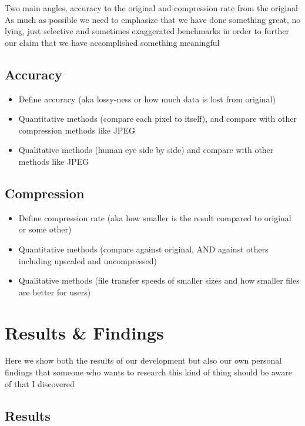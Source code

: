\documentclass[12pt]{article}
\begin{document}
    Two main angles, accuracy to the original and compression rate from the original
    \linebreak
    As much as possible we need to emphasize that we have done something great,
    no lying, just selective and sometimes exaggerated benchmarks in order to further our claim that we
    have accomplished something meaningful

    \subsection{Accuracy}

    \begin{itemize}
        \item Define accuracy (aka lossy-ness or how much data is lost from original)
        \item Quantitative methods (compare each pixel to itself), and compare with other compression methods like JPEG
        \item Qualitative methods (human eye side by side) and compare with other methods like JPEG
    \end{itemize}

    \subsection{Compression}

    \begin{itemize}
        \item Define compression rate (aka how smaller is the result compared to original or some other)
        \item Quantitative methods (compare against original, AND against others including upscaled and uncompressed)
        \item Qualitative methods (file transfer speeds of smaller sizes and how smaller files are better for users)
    \end{itemize}

    \pagebreak


    \section{Results \& Findings}

    Here we show both the results of our development but also our own personal findings that someone who
    wants to research this kind of thing should be aware of that I discovered

    \subsection{Results}
\end{document}
